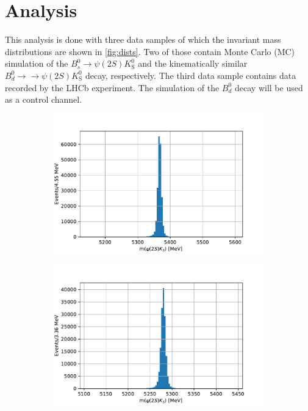 \section{Analysis}\label{sec:analysis}

This analysis is done with three data samples of which the invariant mass distributions are shown in \autoref{fig:dists}. Two of those contain Monte Carlo (MC) simulation of the $B^0_s \to \psi(2S)K^0_\mathrm{S}$ and the kinematically similar $B^0_d \to \to \psi(2S)K^0_\mathrm{S}$ decay, respectively. The third data sample contains data recorded by the LHCb experiment. The simulation of the $B^0_d$ decay will be used as a control channel.

\begin{figure}[tb]
  \centering
  \begin{subfigure}{.32\textwidth}
    \includegraphics[width=\linewidth]{../plots/sim_hist.pdf}
  \end{subfigure}
  \begin{subfigure}{.32\textwidth}
    \includegraphics[width=\linewidth]{../plots/control_sim_hist.pdf}

\end{subfigure}
\end{figure}
